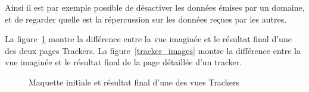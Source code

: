 		Ainsi il est par exemple possible de désactiver les données émises par un domaine, et de regarder quelle est la répercussion sur les données reçues par les autres.

		La figure~\ref{trackers_images} montre la différence entre la vue imaginée et le résultat final d'une des deux pages Trackers. La figure~\ref{tracker_images} montre la différence entre la vue imaginée et le résultat final de la page détaillée d'un tracker.

		\begin{figure}[p]
			\centering
			\caption{Maquette initiale et résultat final d'une des vues Trackers}
			\label{trackers_images}
		\end{figure}

